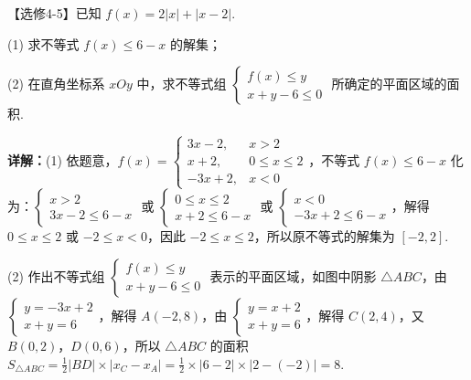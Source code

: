 \begin{question}[points=10]
【选修4-5】已知 $f(x)=2|x|+|x-2|$.



(1) 求不等式 $f(x)\le 6-x$ 的解集；



(2) 在直角坐标系 $xOy$ 中，求不等式组 $\begin{cases} f(x)\le y \\ x+y-6\le0 \end{cases}$ 所确定的平面区域的面积.
\begin{solution}

\textbf{详解：}(1) 依题意，$f(x)=\begin{cases} 3x-2, & x>2 \\ x+2, & 0\le x\le2 \\ -3x+2, & x<0 \end{cases}$，不等式 $f(x)\le6-x$ 化为：$\begin{cases} x>2 \\ 3x-2\le6-x \end{cases}$ 或 $\begin{cases} 0\le x\le2 \\ x+2\le6-x \end{cases}$ 或 $\begin{cases} x<0 \\ -3x+2\le6-x \end{cases}$，解得 $0\le x\le2$ 或 $-2\le x<0$，因此 $-2\le x\le2$，所以原不等式的解集为 $[-2,2]$.

(2) 作出不等式组 $\begin{cases} f(x)\le y \\ x+y-6\le0 \end{cases}$ 表示的平面区域，如图中阴影 $\triangle ABC$，由 $\begin{cases} y=-3x+2 \\ x+y=6 \end{cases}$，解得 $A(-2,8)$，由 $\begin{cases} y=x+2 \\ x+y=6 \end{cases}$，解得 $C(2,4)$，又 $B(0,2)$，$D(0,6)$，所以 $\triangle ABC$ 的面积 $S_{\triangle ABC}=\frac{1}{2}|BD|\times|x_C-x_A|=\frac{1}{2}\times|6-2|\times|2-(-2)|=8$.
\end{solution}
\end{question}

